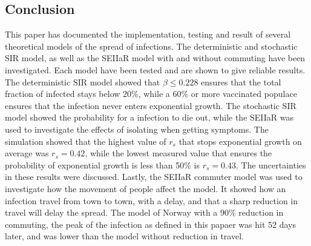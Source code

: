 \documentclass{article}
\begin{document}
    \subsection*{Conclusion}
    This paper has documented the implementation, testing and result of several theoretical models of the spread of infections.
    The deterministic and stochastic SIR model, as well as the SEIIaR model with and without commuting have been investigated.
    Each model have been tested and are shown to give reliable results.
    The deterministic SIR model showed that $\beta \leq 0.228$ ensures that the total fraction of infected stays below 20\%, while a 60\% or more vaccinated populace ensures that the infection never enters exponential growth.
    The stochastic SIR model showed the probability for a infection to die out, while the SEIIaR was used to investigate the effects of isolating when getting symptoms.
    The simulation showed that the highest value of $r_s$ that stops exponential growth on average was $r_s=0.42$, 
    while the lowest measured value that ensures the probability of exponential growth is less than 50\% is $r_s=0.43$. 
    The uncertainties in these results were discussed.
    Lastly, the SEIIaR commuter model was used to investigate how the movement of people affect the model.
    It showed how an infection travel from town to town, with a delay, and that a sharp reduction in travel will delay the spread. 
    The model of Norway with a 90\% reduction in commuting, the peak of the infection as defined in this papaer was hit 52 days later, and was lower than the model without reduction in travel.
    \printbibliography
\end{document}
